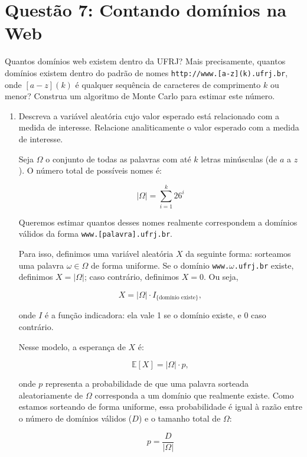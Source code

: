 \documentclass[12 pt]{article}
\begin{document}
\section*{Questão 7: Contando domínios na Web}

Quantos domínios web existem dentro da UFRJ? Mais precisamente, quantos domínios existem dentro do padrão de nomes \texttt{http://www.[a-z](k).ufrj.br}, onde $[a-z](k)$ é qualquer sequência de caracteres de comprimento $k$ ou menor? Construa um algoritmo de Monte Carlo para estimar este número.

\begin{enumerate}
    \item Descreva a variável aleatória cujo valor esperado está relacionado com a medida de interesse. Relacione analiticamente o valor esperado com a medida de interesse.
    \begin{tcolorbox}[colframe=black, title=Resposta:]

        Seja $\Omega$ o conjunto de todas as palavras com até $k$ letras minúsculas (de $a$ a $z$). O número total de possíveis nomes é:

        $$
        |\Omega| = \sum_{i=1}^k 26^i
        $$
        
        Queremos estimar quantos desses nomes realmente correspondem a domínios válidos da forma \texttt{www.[palavra].ufrj.br}.
        
        Para isso, definimos uma variável aleatória $X$ da seguinte forma: sorteamos uma palavra $\omega \in \Omega$ de forma uniforme. Se o domínio \texttt{www.$\omega$.ufrj.br} existe, definimos $X = |\Omega|$; caso contrário, definimos $X = 0$. Ou seja,
        
        $$
        X = |\Omega| \cdot I_{\{\text{domínio existe}\}},
        $$
        
        onde $I$ é a função indicadora: ela vale 1 se o domínio existe, e 0 caso contrário.
        
        Nesse modelo, a esperança de $X$ é:
        
        $$
        \mathbb{E}[X] = |\Omega| \cdot p,
        $$
        
        onde $p$ representa a probabilidade de que uma palavra sorteada aleatoriamente de $\Omega$ corresponda a um domínio que realmente existe. Como estamos sorteando de forma uniforme, essa probabilidade é igual à razão entre o número de domínios válidos ($D$) e o tamanho total de $\Omega$:
        
        $$
        p = \frac{D}{|\Omega|}
        $$
        

\end{tcolorbox}
\end{enumerate}
\end{document}
